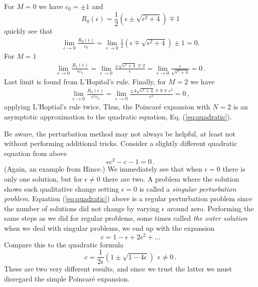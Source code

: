 \begin{example}
	For $M=0$ we have $c_0= \pm 1$ and 
	\begin{equation}
		R_0(\epsilon) = \frac{1}{2}(\epsilon \pm \sqrt{\epsilon^2 + 4}) \mp 1
	\end{equation}
	quickly see that
	\begin{eqnarray}
		\lim_{\epsilon \rightarrow 0} \frac{R_0(\epsilon)}{c_0} = \lim_{\epsilon
		\rightarrow 0} \frac{1}{2}(\epsilon \mp \sqrt{\epsilon^2 + 4}) \pm 	1 =
		0.
	\end{eqnarray}
	For $M=1$
	\begin{eqnarray}
		\lim_{\epsilon \rightarrow 0} \frac{R_1(\epsilon)}{\epsilon c_1} 
		=\lim_{\epsilon \rightarrow 0} \frac{\pm \sqrt{\epsilon^2+4} \mp 2}{\epsilon} 
		= \lim_{\epsilon \rightarrow 0} \frac{\epsilon}{\sqrt{\epsilon^2+4}} = 0 \, .
    \end{eqnarray}
	Last limit is found from L'Hopital's rule. Finally, for $M=2$ we have 
	\begin{eqnarray}
		\lim_{\epsilon \rightarrow 0} \frac{R_2(\epsilon)}{\epsilon^2 c_2} 
		= \lim_{\epsilon \rightarrow 0} \frac{\pm 4\sqrt{\epsilon^2 +4} \mp 8 \mp \epsilon^2}{\epsilon^2} 
		= 0 \, ,
	\end{eqnarray}
	applying L'Hoptial's rule twice. Thus, the Poincar\'{e} expansion with $N=2$ is an 
	asymptotic approximation to the quadratic equation, Eq. (\ref{eq:quadratic}). 
\end{example}

\noindent Be aware, the perturbation method may not always
be helpful, at least not without performing additional tricks. Consider a
slightly different quadratic equation from above  
\begin{equation}
  \epsilon c^2 -c -1 = 0 \, .
\end{equation}
(Again, an example from Hince.) We immediately see that when $\epsilon=0$ 
there is only one solution, but for $\epsilon \neq 0$ there are two. 
A problem where the solution
shows such qualitative change setting $\epsilon=0$ is called a
\emph{singular perturbation problem}. Equation (\ref{eq:quadratic}) above 
is a regular perturbation problem since the number of
solutions did not change by varying $\epsilon$ around zero.
Performing the same steps as we did for regular problems,  
some times called \emph{the outer solution} when we deal with singular problems, we end up with the expansion
\begin{equation}
  c = 1 -\epsilon + 2\epsilon^2 + \ldots
\end{equation}
Compare this to the quadratic formula
\begin{equation}
	\label{eq:quadricformulaPerturb}
  c = \frac{1}{2\epsilon}(1 \pm \sqrt{1-4\epsilon}) \ \ \epsilon  \neq 0 \, .
\end{equation}
These are two very different results, and since we trust the latter we must disregard the 
simple Poincar\'{e} expansion. 

